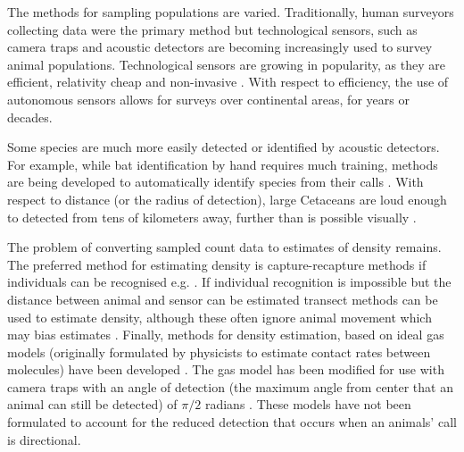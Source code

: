 \documentclass[a4paper,10pt,reqno,oneside]{amsart}
\begin{document}
The methods for sampling populations are varied. Traditionally, human surveyors collecting data were the primary method but technological sensors, such as camera traps \citep{ahumada2011community, rowcliffe2008surveys} and acoustic detectors \citep{ofarrel1999comparison, jones2011indicator, mellinger2007fixed} are becoming increasingly used to survey animal populations.  Technological sensors are growing in popularity, as they are efficient, relativity cheap and non-invasive \citep{gese2001monitoring, o2003crouching, silveira2003camera}. With respect to efficiency, the use of autonomous sensors allows for surveys over continental areas, for years or decades. 

Some species are much more easily detected or identified by acoustic detectors. For example, while bat identification by hand requires much training, methods are being developed to automatically identify species from their calls \citep{walters_2012, Adams_2010}. With respect to distance (or the radius of detection), large Cetaceans are loud enough to detected from tens of kilometers away, further than is possible visually \cite{clark1995application, barlow2005estimates, mcdonald2004difar}.  


The problem of converting sampled count data to estimates of density remains. The preferred method for estimating density is capture-recapture methods \citep{leslie1953estimation,schwarz1999} if individuals can be recognised e.g. \citep{karanth1995, trolle2003estimation, soisalo2006estimating, trolle2007camera}. If individual recognition is impossible but the distance between animal and sensor can be estimated transect methods can be used to estimate density, although these often ignore animal movement which may bias estimates \citep{barlow2005estimates, marques2011estimating}. Finally, methods for density estimation, based on ideal gas models (originally formulated by physicists to estimate contact rates between molecules) have been developed \citep{yapp1956theory, Hutchinson_Waser_2007}. The gas model has been modified for use with camera traps with an angle of detection (the maximum angle from center that an animal can still be detected)  of $\pi/2$ radians \citep{rowcliffe2008estimating}. These models have not been formulated to account for the reduced detection that occurs when an animals' call is directional.
\end{document}
